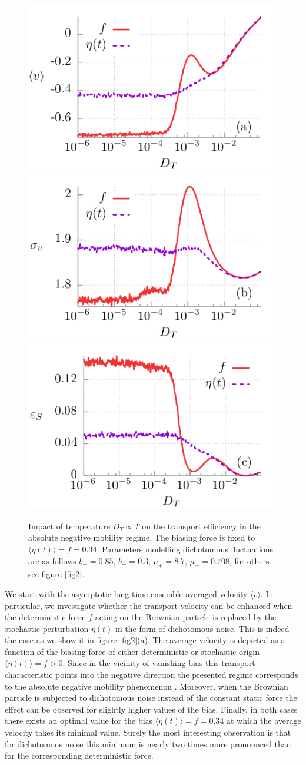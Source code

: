 \documentclass[12pt]{iopart}
\begin{document}
\begin{figure}[t]
	\centering
	\includegraphics[width=0.45\linewidth]{fig3a.pdf}
	\includegraphics[width=0.45\linewidth]{fig3b.pdf}\\
	\includegraphics[width=0.45\linewidth]{fig3c.pdf}
	\caption{Impact of temperature $D_T \propto T$ on the transport efficiency in the absolute negative mobility regime. The biasing force is fixed to $\langle \eta(t) \rangle = f = 0.34$. Parameters modelling dichotomous fluctuations are as follows $b_+ = 0.85$, $b_- = 0.3$, $\mu_+ = 8.7$, $\mu_- = 0.708$, for others see figure \ref{fig2}.}
	\label{fig3}
\end{figure}
We start with the asymptotic long time ensemble averaged velocity $\langle v \rangle$. In particular, we investigate whether the transport velocity can be enhanced when the deterministic force $f$ acting on the Brownian particle is replaced by the stochastic perturbation $\eta(t)$ in the form of dichotomous noise. This is indeed the case as we show it in figure \ref{fig2}(a). The average velocity is depicted as a function of the biasing force of either deterministic or stochastic origin $\langle \eta(t) \rangle = f > 0$. Since in the vicinity of vanishing bias this transport characteristic points into the negative direction the presented regime corresponds to the absolute negative mobility phenomenon \cite{MacKos2007}. 
Moreover, when the Brownian particle is subjected to  dichotomous noise instead of the constant static force the effect can be observed for slightly higher values of the bias. 
Finally, in both cases there exists an optimal value for the bias $\langle \eta(t) \rangle = f = 0.34$ at which the average velocity takes its minimal value. Surely the most interesting observation is that for dichotomous noise this minimum is 
nearly two times more pronounced than for the corresponding deterministic force.
\end{document}
